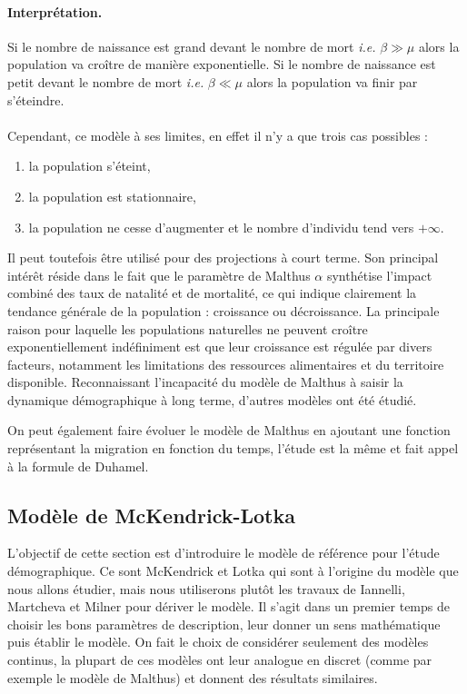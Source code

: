 \paragraph{Interprétation.} Si le nombre de naissance est grand devant le nombre de mort \textit{i.e.} $\beta \gg \mu$ alors la population va croître de manière exponentielle. Si le nombre de naissance est petit devant le nombre de mort \textit{i.e.} $\beta \ll \mu$ alors la population va finir par s'éteindre.
\\\\
Cependant, ce modèle à ses limites, en effet il n'y a que trois cas possibles : 
\begin{enumerate}
    \item la population s'éteint,
    \item la population est stationnaire,
    \item la population ne cesse d'augmenter et le nombre d'individu tend vers $+\infty$.
\end{enumerate}
Il peut toutefois être utilisé pour des projections à court terme. Son principal intérêt réside dans le fait que le paramètre de Malthus $\alpha$ synthétise l'impact combiné des taux de natalité et de mortalité, ce qui indique clairement la tendance générale de la population : croissance ou décroissance. La principale raison pour laquelle les populations naturelles ne peuvent croître exponentiellement indéfiniment est que leur croissance est régulée par divers facteurs, notamment les limitations des ressources alimentaires et du territoire disponible. Reconnaissant l'incapacité du modèle de Malthus à saisir la dynamique démographique à long terme, d'autres modèles ont été étudié.

\begin{remark}
    On peut également faire évoluer le modèle de Malthus en ajoutant une fonction représentant la migration en fonction du temps, l'étude est la même et fait appel à la formule de Duhamel.
\end{remark}

\subsection{Modèle de McKendrick-Lotka}
L'objectif de cette section est d'introduire le modèle de référence pour l'étude démographique. Ce sont McKendrick \cite{McKendrick1926} et Lotka \cite{Lotka1911} qui sont à l'origine du modèle que nous allons étudier, mais nous utiliserons plutôt les travaux de Iannelli, Martcheva et Milner \cite{Iannelli2005} pour dériver le modèle. Il s'agit dans un premier temps de choisir les bons paramètres de description, leur donner un sens mathématique puis établir le modèle. On fait le choix de considérer seulement des modèles continus, la plupart de ces modèles ont leur analogue en discret (comme par exemple le modèle de Malthus) et donnent des résultats similaires.

